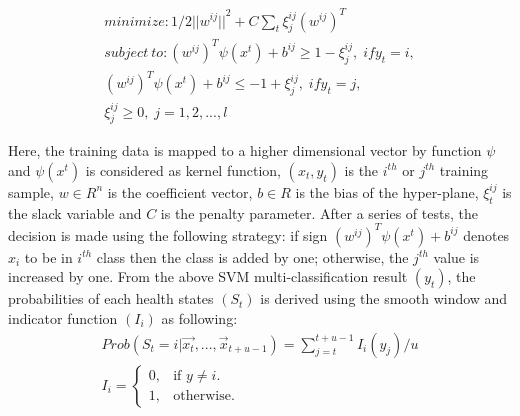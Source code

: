 \begin{equation}
\begin{split}
    minimize : 1/2 {|| w^{ij}||}^2 + C\sum_{t} \xi_j^{ij}(w^{ij})^T\\
    subject\:to: (w^{ij})^T \psi(x^t) + b^{ij}\geq 1 - \xi_j^{ij}, \; if y_t = i,\\
    (w^{ij})^T \psi(x^t) + b^{ij}\leq -1 + \xi_j^{ij}, \; if y_t = j,\\
    \xi_j^{ij} \geq 0 , \; j = 1, 2, ..., l
    \end{split}
\end{equation}

Here, the training data is mapped to a higher dimensional vector by function $\psi$ and $\psi(x^t)$ is considered as kernel function, $(x_t,y_t)$ is the $i^{th}$ or $j^{th}$ training sample, $w \in R^n$ is the coefficient vector, $b \in R$ is the bias
of the hyper-plane, $\xi_t^{ij}$ is the slack variable and $C$ is the penalty parameter. After a series of
tests, the decision is made using the following strategy: if sign $(w^{ij})^T \psi(x^t) + b^{ij}$ denotes $x_i$ to be in $i^{th}$ class then the class is added by one; otherwise, the $j^{th}$ value is increased by one.\newline
From the above SVM multi-classification result $(y_t)$, the probabilities of each health states $(S_t)$ is derived using the smooth window and indicator function $(I_i)$ as following: 
\begin{equation}
    \begin{split}
        Prob(S_t = i|\overrightarrow{x_t}, ..., \overrightarrow{x}_{t+u-1}) = \sum _{j=t}^{t+u-1} I_i(y_j)/u\\
        I_i = \left\{
        \begin{array}{ll}
          0, & \mbox{if $y \neq i$}.\\
          1, & \mbox{otherwise}.
        \end{array}
      \right.
    \end{split}
\end{equation}

